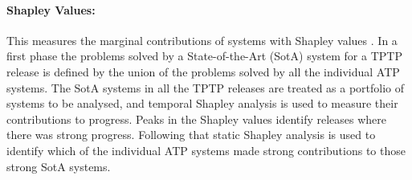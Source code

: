 \documentclass[runningheads]{llncs}
\begin{document}
\vspace*{-0.5em}
\paragraph{Shapley Values:}
This measures the marginal contributions of systems with Shapley values \cite{XH+12}.
In a first phase the problems solved by a State-of-the-Art (SotA) system for a TPTP release is 
defined by the union of the problems solved by all the individual ATP systems.
The SotA systems in all the TPTP releases are treated as a portfolio of systems to be analysed, 
and temporal Shapley analysis \cite{KF+19} is used to measure their contributions to progress.
Peaks in the Shapley values identify releases where there was strong progress.
Following that static Shapley analysis \cite{FK+16} is used to identify which of 
the individual ATP systems made strong contributions to those strong SotA systems.
\end{document}
